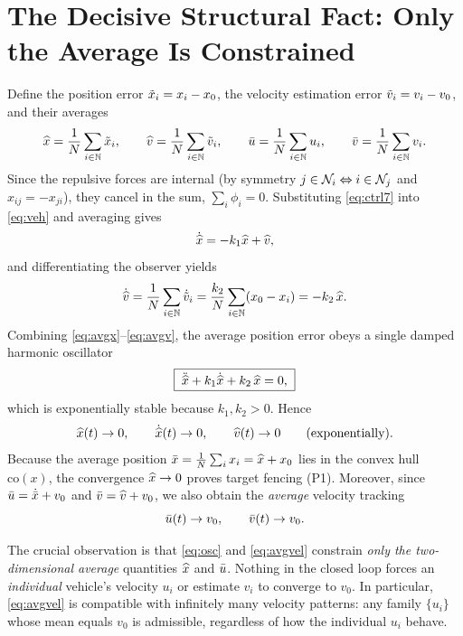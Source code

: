 \section{The Decisive Structural Fact: Only the Average Is Constrained}
\label{sec:avg}

Define the position error $\tilde{x}_i=x_i-x_0$, the velocity estimation error $\tilde{v}_i=v_i-v_0$, and
their averages
\begin{equation}
  \widehat{x}=\frac{1}{N}\sum_{i\in\mathbb{N}}\tilde{x}_i,\qquad
  \widehat{v}=\frac{1}{N}\sum_{i\in\mathbb{N}}\tilde{v}_i,
  \qquad
  \bar{u}=\frac{1}{N}\sum_{i\in\mathbb{N}}u_i,\qquad
  \bar{v}=\frac{1}{N}\sum_{i\in\mathbb{N}}v_i .
  \label{eq:averages}
\end{equation}
Since the repulsive forces are internal (by symmetry $j\in\mathcal{N}_i\Leftrightarrow i\in\mathcal{N}_j$ and
$x_{ij}=-x_{ji}$), they cancel in the sum, $\sum_{i}\phi_i=0$. Substituting \eqref{eq:ctrl7} into
\eqref{eq:veh} and averaging gives
\begin{equation}
  \dot{\widehat{x}}=-k_1\widehat{x}+\widehat{v},
  \label{eq:avgx}
\end{equation}
and differentiating the observer yields
\begin{equation}
  \dot{\widehat{v}}=\frac{1}{N}\sum_{i\in\mathbb{N}}\dot{\tilde{v}}_i
        =\frac{k_2}{N}\sum_{i\in\mathbb{N}}(x_0-x_i)=-k_2\,\widehat{x} .
  \label{eq:avgv}
\end{equation}
Combining \eqref{eq:avgx}--\eqref{eq:avgv}, the average position error obeys a single damped
harmonic oscillator
\begin{equation}
  \boxed{\;\ddot{\widehat{x}}+k_1\dot{\widehat{x}}+k_2\,\widehat{x}=0,\;}
  \label{eq:osc}
\end{equation}
which is exponentially stable because $k_1,k_2>0$. Hence
\begin{equation}
  \widehat{x}(t)\to 0,\qquad \dot{\widehat{x}}(t)\to 0,\qquad \widehat{v}(t)\to 0
  \qquad\text{(exponentially)}.
  \label{eq:conv}
\end{equation}
Because the average position $\bar{x}=\frac1N\sum_i x_i=\widehat{x}+x_0$ lies in the convex hull
$\mathrm{co}(x)$, the convergence $\widehat{x}\to 0$ proves target fencing (P1). Moreover, since
$\bar{u}=\dot{\bar{x}}+v_0$ and $\bar{v}=\widehat{v}+v_0$, we also obtain the \emph{average} velocity tracking
\begin{equation}
  \bar{u}(t)\to v_0,\qquad \bar{v}(t)\to v_0 .
  \label{eq:avgvel}
\end{equation}

The crucial observation is that \eqref{eq:osc} and \eqref{eq:avgvel} constrain \emph{only the
two-dimensional average} quantities $\widehat{x}$ and $\bar{u}$. Nothing in the closed loop forces an
\emph{individual} vehicle's velocity $u_i$ or estimate $v_i$ to converge to $v_0$. In particular,
\eqref{eq:avgvel} is compatible with infinitely many velocity patterns: any family $\{u_i\}$ whose
mean equals $v_0$ is admissible, regardless of how the individual $u_i$ behave.

